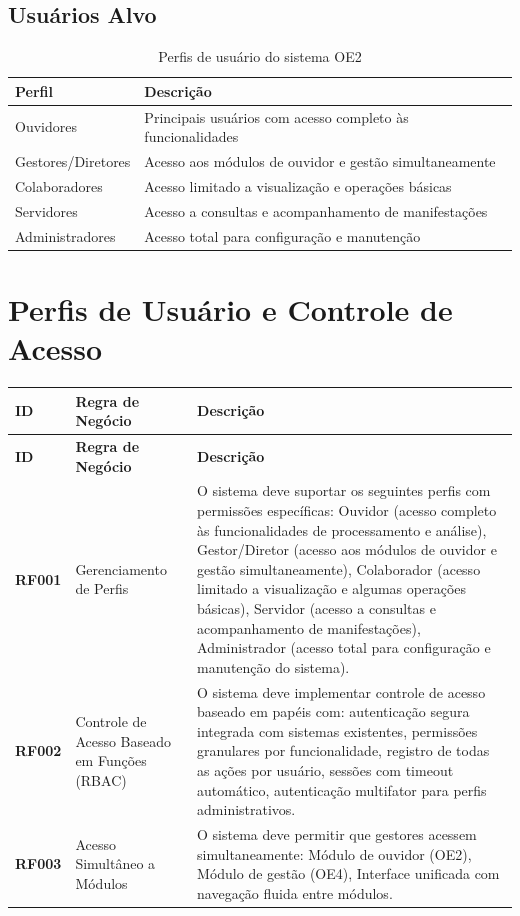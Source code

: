 \documentclass[12pt,a4paper]{article}
\newcommand{\rf}[1]{\textbf{\color{primaryblue}RF#1}}
\begin{document}
\subsection{Usuários Alvo}

\begin{table}[h]
\centering
\begin{tabular}{@{}lp{8cm}@{}}
\toprule
\textbf{Perfil} & \textbf{Descrição} \\
\midrule
Ouvidores & Principais usuários com acesso completo às funcionalidades \\
Gestores/Diretores & Acesso aos módulos de ouvidor e gestão simultaneamente \\
Colaboradores & Acesso limitado a visualização e operações básicas \\
Servidores & Acesso a consultas e acompanhamento de manifestações \\
Administradores & Acesso total para configuração e manutenção \\
\bottomrule
\end{tabular}
\caption{Perfis de usuário do sistema OE2}
\end{table}

\section{Perfis de Usuário e Controle de Acesso}

\begin{longtable}{|p{2cm}|p{5cm}|p{8cm}|}
\hline
\textbf{ID} & \textbf{Regra de Negócio} & \textbf{Descrição} \\
\hline
\endfirsthead
\hline
\textbf{ID} & \textbf{Regra de Negócio} & \textbf{Descrição} \\
\hline
\endhead

\rf{001} & Gerenciamento de Perfis & O sistema deve suportar os seguintes perfis com permissões específicas: Ouvidor (acesso completo às funcionalidades de processamento e análise), Gestor/Diretor (acesso aos módulos de ouvidor e gestão simultaneamente), Colaborador (acesso limitado a visualização e algumas operações básicas), Servidor (acesso a consultas e acompanhamento de manifestações), Administrador (acesso total para configuração e manutenção do sistema). \\
\hline

\rf{002} & Controle de Acesso Baseado em Funções (RBAC) & O sistema deve implementar controle de acesso baseado em papéis com: autenticação segura integrada com sistemas existentes, permissões granulares por funcionalidade, registro de todas as ações por usuário, sessões com timeout automático, autenticação multifator para perfis administrativos. \\
\hline

\rf{003} & Acesso Simultâneo a Módulos & O sistema deve permitir que gestores acessem simultaneamente: Módulo de ouvidor (OE2), Módulo de gestão (OE4), Interface unificada com navegação fluida entre módulos. \\
\hline

\end{longtable}
\end{document}
